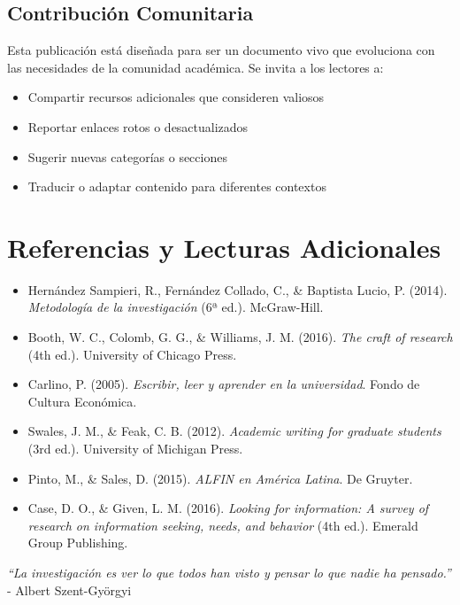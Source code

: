 \documentclass[
  jou,
  floatsintext,
  longtable,
  a4paper,
  nolmodern,
  notxfonts,
  notimes,
  12pt,
  colorlinks=true,linkcolor=blue,citecolor=blue,urlcolor=blue]{apa7}
\providecommand{\tightlist}{%
  \setlength{\itemsep}{0pt}\setlength{\parskip}{0pt}}
\begin{document}
\subsection{Contribución Comunitaria}\label{contribuciuxf3n-comunitaria}

Esta publicación está diseñada para ser un documento vivo que evoluciona
con las necesidades de la comunidad académica. Se invita a los lectores
a:

\begin{itemize}
\tightlist
\item
  Compartir recursos adicionales que consideren valiosos
\item
  Reportar enlaces rotos o desactualizados
\item
  Sugerir nuevas categorías o secciones
\item
  Traducir o adaptar contenido para diferentes contextos
\end{itemize}

\section{Referencias y Lecturas
Adicionales}\label{referencias-y-lecturas-adicionales}

\begin{itemize}
\tightlist
\item
  Hernández Sampieri, R., Fernández Collado, C., \& Baptista Lucio, P.
  (2014). \emph{Metodología de la investigación} (6ª ed.). McGraw-Hill.
\item
  Booth, W. C., Colomb, G. G., \& Williams, J. M. (2016). \emph{The
  craft of research} (4th ed.). University of Chicago Press.
\item
  Carlino, P. (2005). \emph{Escribir, leer y aprender en la
  universidad}. Fondo de Cultura Económica.
\item
  Swales, J. M., \& Feak, C. B. (2012). \emph{Academic writing for
  graduate students} (3rd ed.). University of Michigan Press.
\item
  Pinto, M., \& Sales, D. (2015). \emph{ALFIN en América Latina}. De
  Gruyter.
\item
  Case, D. O., \& Given, L. M. (2016). \emph{Looking for information: A
  survey of research on information seeking, needs, and behavior} (4th
  ed.). Emerald Group Publishing.
\end{itemize}

\emph{``La investigación es ver lo que todos han visto y pensar lo que
nadie ha pensado.''} - Albert Szent-Györgyi
\end{document}
